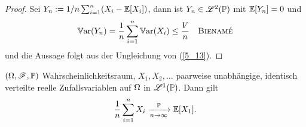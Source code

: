 \begin{proof}
	Sei $Y_n := 1/n \sum_{i=1}^n (X_i - \mathbb{E}[X_i])$, dann ist $Y_n \in \mathscr{L}^{2}(\mathbb{P})$ mit $\mathbb{E}[Y_n] = 0$ und
	\begin{align*}
		\mathbb{V}\text{ar}(Y_n) = \frac{1}{n} \sum_{i=1}^n \mathbb{V}\text{ar}(X_i) \le \frac{V}{n} \quad \text{\textsc{Bienamé}} 
	\end{align*}
	und  die Aussage folgt aus der Ungleichung von  (\cref{5_13}).
\end{proof}
\begin{proposition}
	$(\Omega, \mathscr F, \mathbb{P})$ Wahrscheinlichkeitsraum, $X_1, X_2, \dots$ paarweise unabhängige, identisch verteilte reelle Zufallsvariablen auf $\Omega$ in $\mathscr{L}^{1}(\mathbb{P})$. Dann gilt
	\begin{align*}
		\frac{1}{n} \sum_{i=1}^n X_i \xrightarrow[n \to \infty]{\mathbb{P}} \mathbb{E}[X_1].
	\end{align*}
\end{proposition}

